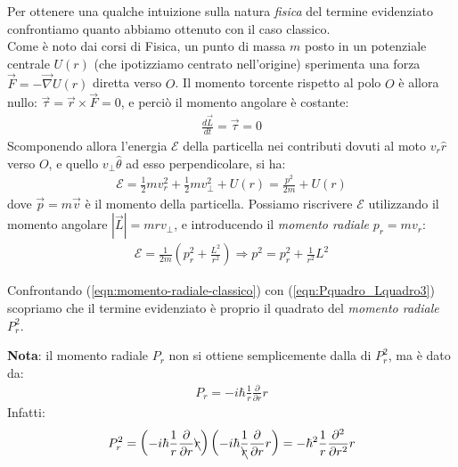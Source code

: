 \documentclass[../../FisicaTeorica.tex]{subfiles}
\begin{document}
Per ottenere una qualche intuizione sulla natura \textit{fisica} del termine evidenziato confrontiamo quanto abbiamo ottenuto con il caso classico.\\
Come è noto dai corsi di Fisica, un punto di massa $m$ posto in un potenziale centrale $U(r)$ (che ipotizziamo centrato nell'origine) sperimenta una forza $\vec{F} = -\vec{\nabla}U(r)$ diretta verso $O$. Il momento torcente rispetto al polo $O$ è allora nullo: $\vec{\tau}=\vec{r}\times \vec{F} =0$, e perciò il momento angolare è costante:
\begin{align*}
\frac{d\vec{L}}{dt}=\vec{\tau} =0
\end{align*}
Scomponendo allora l'energia $\mathcal{E}$ della particella nei contributi dovuti al moto $v_r \hat{r}$ verso $O$, e quello $v_\perp \hat{\theta}$ ad esso perpendicolare, si ha:
\begin{align*}
\mathcal{E} =\frac{1}{2}mv_r^2 + \frac{1}{2}mv_\perp^2 + U(r) = \frac{p^2}{2m} + U(r)
\end{align*}
dove $\vec{p}=m\vec{v}$ è il momento della particella. Possiamo riscrivere $\mathcal{E}$ utilizzando il momento angolare $|\vec{L}|=mrv_\perp$, e introducendo il \textit{momento radiale} $p_r = m v_r$:
\begin{align}
\mathcal{E} = \frac{1}{2m}\left(p_r^2 + \frac{L^2}{r^2}\right) \Rightarrow  p^2=p_r^2 + \frac{1}{r^2}L^2
\label{eqn:momento-radiale-classico}
\end{align}

Confrontando (\ref{eqn:momento-radiale-classico}) con (\ref{eqn:Pquadro_Lquadro3}) scopriamo che il termine evidenziato è proprio il quadrato del \textit{momento radiale} $P_r^2$.

\begin{expl}
\textbf{Nota}: il momento radiale $P_r$ non si ottiene semplicemente dalla  di $P_r^2$, ma è dato da:
\begin{align*}
P_r = -i\hbar\frac{1}{r}\frac{\partial}{\partial r} r
\end{align*}
Infatti:
\begin{align*}
P_r^2=\left(-i\hbar \frac{1}{r}\frac{\partial}{\partial r} \bcancel{r}\right)\left(-i\hbar \frac{1}{\bcancel{r}}\frac{\partial}{\partial r}r\right) = -\hbar^2\frac{1}{r}\frac{\partial^2}{\partial r^2} r
\end{align*}
\end{expl}
\end{document}
